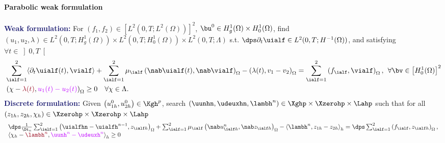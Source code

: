 \begin{frame}
\begin{overprint}
\vspace{0.1 cm}
\textcolor{cadmiumgreen}{\textbf{Parabolic weak formulation}}
\\\\
\textcolor{midnightblue}{\textbf{Weak formulation:}} 
For $\left(f_1,f_2\right) \in  [L^2(0,T;L^2(\Omega))]^2$, $\bu^0 \in H_g^1(\Omega) \times H_0^1(\Omega)$, 
find  $(u_1,u_2,\lambda) \in L^2(0,T;H_g^1(\Omega)) \times L^2(0,T;H_0^1(\Omega)) \times L^2(0,T; \Lambda)$ s.t. $\dps \partial_t \uialf \in L^2(0,T;H^{-1}(\Omega))$, and satisfying $\forall t \in \left]0,T\right[$ 
\begin{equation*}
\vspace{-0.2 cm}
\begin{split}
&\sum_{\ialf=1}^2 \langle \partial_t \uialf(t), \vialf \rangle + \sum_{\ialf=1}^2 \mu_\ialf \left(\nab \uialf(t), \nab \vialf \right)_{\Omega} - \left(\lambda(t),v_1-v_2\right)_{\Omega} = \sum_{\ialf=1}^2 \left(f_\ialf, \vialf \right)_{\Omega}, \hspace{0.15 cm} \forall \bv \in \left[H_0^1(\Omega)\right]^2 \\
& \left(\chi-\textcolor{carmine}{\lambda(t)}, \textcolor{electricpurple}{u_1(t)-u_2(t)}\right)_{\Omega} \geq 0 \quad \forall \chi \in \Lambda.
\end{split}
\end{equation*}
\textcolor{midnightblue}{\textbf{Discrete formulation:}}
Given $\left(u_{1h}^0,u_{2h}^0 \right) \in \Kgh^{p}$, search $(\uunhn,\udeuxhn,\lambh^n)\in \Xghp \times \Xzerohp \times
\Lahp$ such that for all $\left(z_{1h},z_{2h},\chi_h\right) \in \Xzerohp \times \Xzerohp \times \Lahp$ 
\begin{equation*}
\begin{array}{lcl}
\dps \frac{1}{\Dt_n} \sum_{\ialf=1}^2 \left(\uialfhn-\uialfh^{n-1}, z_{\ialf h}\right)_{\Omega} + \sum_{\ialf=1}^2 \mu_\ialf \left(\nab u_{\ialf h}^n, \nab z_{\ialf h}\right)_{\Omega}
- \left\langle \lambh^n, z_{1h}-z_{2h} \right \rangle_h
=  \dps \sum_{\ialf=1}^2 \left(f_\ialf,z_{\ialf h}\right)_{\Omega}, \\
\left\langle \chi_h - \textcolor{carmine}{\lambh^n}, \textcolor{electricpurple}{\uunh^n - \udeuxh^n}\right \rangle_h   \geq 0 
\end{array}
\end{equation*}



\end{overprint}
\end{frame}
